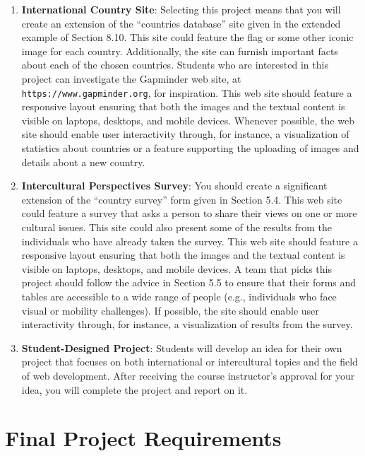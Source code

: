 \documentclass[11pt]{article}
\newcommand{\url}[1]{\lstinline{#1}}
\begin{document}
\begin{enumerate}
  \item {\bf International Country Site}: Selecting this project means that you
    will create an extension of the ``countries database'' site given in the
    extended example of Section 8.10. This site could feature the flag or some
    other iconic image for each country. Additionally, the site can furnish
    important facts about each of the chosen countries. Students who are
    interested in this project can investigate the Gapminder web site, at
    \url{https://www.gapminder.org}, for inspiration. This web site should
    feature a responsive layout ensuring that both the images and the textual
    content is visible on laptops, desktops, and mobile devices. Whenever
    possible, the web site should enable user interactivity through, for
    instance, a visualization of statistics about countries or a feature
    supporting the uploading of images and details about a new country.

  \item {\bf Intercultural Perspectives Survey}: You should create a
    significant extension of the ``country survey'' form given in Section 5.4.
    This web site could feature a survey that asks a person to share their views
    on one or more cultural issues. This site could also present some of the
    results from the individuals who have already taken the survey. This web
    site should feature a responsive layout ensuring that both the images and
    the textual content is visible on laptops, desktops, and mobile devices. A
    team that picks this project should follow the advice in Section 5.5 to
    ensure that their forms and tables are accessible to a wide range of people
    (e.g., individuals who face visual or mobility challenges). If possible, the
    site should enable user interactivity through, for instance, a visualization
    of results from the survey.

  \item {\bf Student-Designed Project}: Students will develop an idea for their
    own project that focuses on both international or intercultural topics and
    the field of web development. After receiving the course instructor's
    approval for your idea, you will complete the project and report on it.

\end{enumerate}

\section*{Final Project Requirements}
\end{document}
